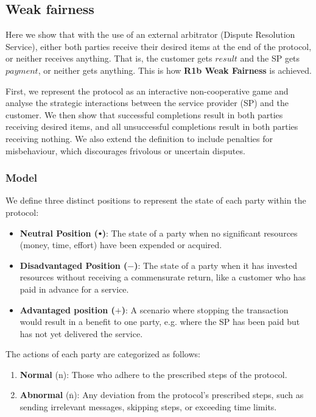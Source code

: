 \documentclass[pdftex,twocolumn,epjc3]{svjour3}
\newcommand{\normal}{\mathrm{n}}
\newcommand{\abnormal}{\overline{\mathrm{n}}}
\newcommand{\plus}{+}
\newcommand{\minus}{-}
\newcommand\neutral[1][.75]{\mathbin{\ThisStyle{\vcenter{\hbox{%
  \scalebox{#1}{$\SavedStyle\bullet$}}}}}%
}
\begin{document}
\subsection{Weak fairness}
Here we show that with the use of an external arbitrator (Dispute Resolution Service), either both parties receive their desired items at the end of the protocol, or neither receives anything. That is, the customer gets $result$ and the SP gets $payment$, or neither gets anything. This is how \textbf{R1b Weak Fairness} is achieved. 

First, we represent the protocol as an interactive non-cooperative game and analyse the strategic interactions between the service provider (SP) and the customer. We then show that successful completions result in both parties receiving desired items, and all unsuccessful completions result in both parties receiving nothing. We also extend the definition to include penalties for misbehaviour, which discourages frivolous or uncertain disputes.

\subsubsection{Model}\label{sec:fairness-model}
We define three distinct positions to represent the state of each party within the protocol:


\begin{itemize}
\item \textbf{Neutral Position ($\neutral{}$)}: The state of a party when no significant resources (money, time, effort) have been expended or acquired.
\item \textbf{Disadvantaged Position ($\minus{}$)}: The state of a party when it has invested resources without receiving a commensurate return, like a customer who has paid in advance for a service.
\item \textbf{Advantaged position ($\plus{}$)}: A scenario where stopping the transaction would result in a benefit to one party, e.g. where the SP has been paid but has not yet delivered the service.
\end{itemize}

The actions of each party are categorized as follows:

\begin{enumerate}
\item \textbf{Normal} ($\normal{}$): Those who adhere to the prescribed steps of the protocol.
\item \textbf{Abnormal} ($\abnormal{}$): Any deviation from the protocol's prescribed steps, such as sending irrelevant messages, skipping steps, or exceeding time limits.
\end{enumerate}
\end{document}
